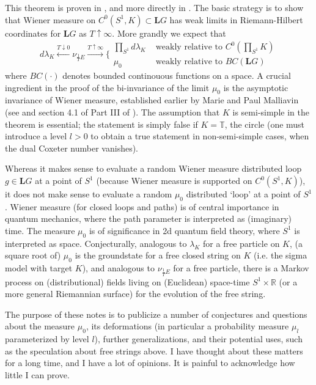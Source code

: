 \documentclass{amsart}
\theoremstyle{conjecture}
\theoremstyle{definition}
\theoremstyle{question}
\theoremstyle{questions}
\theoremstyle{remark}
\theoremstyle{remarks}
\theoremstyle{example}
\numberwithin{equation}{section}
\begin{document}
This theorem is proven in \cite{Pi1}, and more directly in \cite{Pi2}. The basic strategy is to show
that Wiener measure  on $C^0(S^1,K)\subset\mathbf LG$ has weak
limits in Riemann-Hilbert coordinates for $\mathbf LG$ as $T\uparrow\infty$. More grandly we expect that 
\begin{equation}\label{limits1}d\lambda_K \stackrel{T\downarrow 0}{\leftarrow} \nu_{\frac 1T E}\stackrel{T\uparrow \infty}{\rightarrow} \{ \begin{matrix} \prod_{S^1}d\lambda_K& \text{ weakly relative to } C^0(\prod_{S^1} K)\\ \mu_0& \text{ weakly relative to } BC(\mathbf LG) \end{matrix}\end{equation}
where $BC(\cdot)$ denotes bounded continouous functions on a space. A crucial ingredient in the proof of the
bi-invariance of the limit $\mu_0$ is the asymptotic invariance of
Wiener measure, established earlier by Marie and Paul Malliavin
(see \cite{MM2} and section 4.1 of Part III of \cite{Pi1}). The assumption that $K$ is semi-simple in the theorem is essential; the statement is simply false
if $K=\mathbb T$, the circle (one must introduce a level $l>0$ to obtain a true statement in non-semi-simple cases, when the dual Coxeter number vanishes).

Whereas it makes sense to evaluate a random Wiener measure distributed loop $g\in \mathbf LG$ at a point of $S^1$ (because Wiener measure 
is supported on $C^0(S^1,K)$), it does not make sense to evaluate a random $\mu_0$ distributed `loop' at a point of $S^1$. Wiener measure (for closed loops and
paths) is of central importance in quantum mechanics, where the path parameter is interpreted as (imaginary) time. The measure $\mu_0$ is of significance in
2d quantum field theory, where $S^1$ is interpreted as space. Conjecturally, analogous to $\lambda_K$ for a free particle on $K$, (a square root of) $\mu_0$ is the groundstate for a free closed string on $K$ (i.e. the sigma model with target $K$), and analogous to $\nu_{\frac 1T E}$ for a free particle, there is a Markov process on (distributional) fields living on (Euclidean) space-time $S^1 \times \mathbb R$ (or a more general Riemannian surface) for the evolution of the free string. 

The purpose of these notes is to publicize a number of conjectures and questions about the measure $\mu_0$, its deformations (in particular a probability measure $\mu_l$ parameterized by level $l$), further generalizations, and their potential uses, such as the speculation about free strings above. I have thought about 
these matters for a long time, and I have a lot of opinions. It is painful to acknowledge how little I can prove. 
\end{document}
